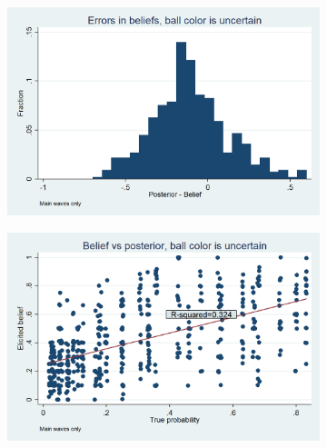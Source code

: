 \documentclass[12pt,a4paper]{article}
\begin{document}
\begin{figure}[H]
\centering
\caption{Belief Updating} \label{Bel_Upd_Fig}
\begin{subfigure}[t]{.48\textwidth}
  \centering
  \includegraphics[width=\textwidth]{Graphs/hist_belief_error_s4.png}
\end{subfigure}
\begin{subfigure}[t]{.48\textwidth}
  \centering
  \includegraphics[width=\textwidth]{Graphs/updating_s4.png}


\end{subfigure}
\end{figure}
\end{document}
